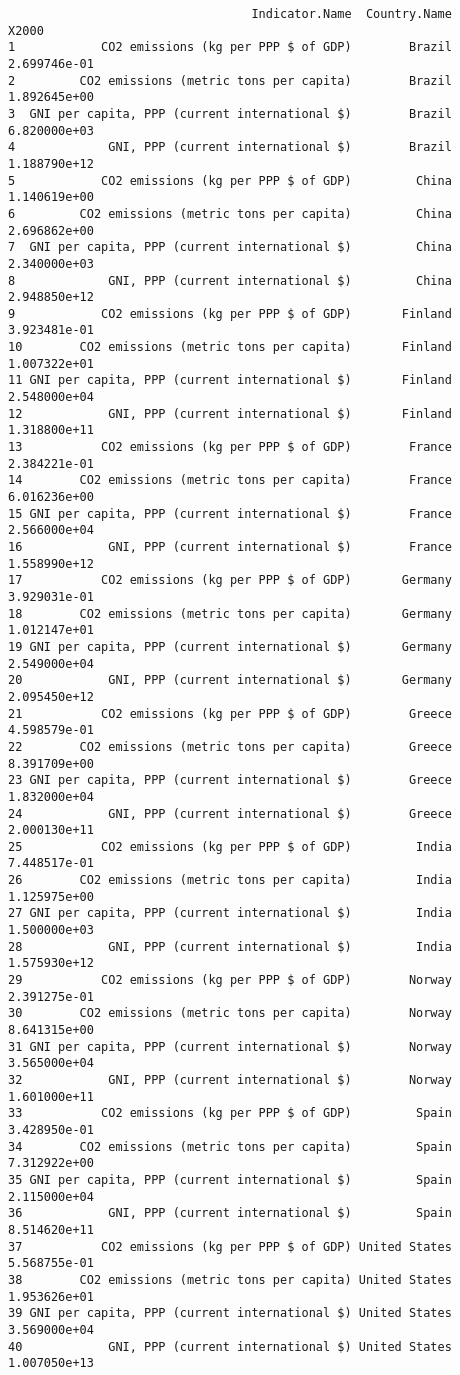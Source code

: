 \documentclass[xcolor={usenames,svgnames,dvipsnames}]{beamer}
\begin{document}
\begin{frame}[fragile]
\begin{verbatim}
                                  Indicator.Name  Country.Name        X2000
1            CO2 emissions (kg per PPP $ of GDP)        Brazil 2.699746e-01
2         CO2 emissions (metric tons per capita)        Brazil 1.892645e+00
3  GNI per capita, PPP (current international $)        Brazil 6.820000e+03
4             GNI, PPP (current international $)        Brazil 1.188790e+12
5            CO2 emissions (kg per PPP $ of GDP)         China 1.140619e+00
6         CO2 emissions (metric tons per capita)         China 2.696862e+00
7  GNI per capita, PPP (current international $)         China 2.340000e+03
8             GNI, PPP (current international $)         China 2.948850e+12
9            CO2 emissions (kg per PPP $ of GDP)       Finland 3.923481e-01
10        CO2 emissions (metric tons per capita)       Finland 1.007322e+01
11 GNI per capita, PPP (current international $)       Finland 2.548000e+04
12            GNI, PPP (current international $)       Finland 1.318800e+11
13           CO2 emissions (kg per PPP $ of GDP)        France 2.384221e-01
14        CO2 emissions (metric tons per capita)        France 6.016236e+00
15 GNI per capita, PPP (current international $)        France 2.566000e+04
16            GNI, PPP (current international $)        France 1.558990e+12
17           CO2 emissions (kg per PPP $ of GDP)       Germany 3.929031e-01
18        CO2 emissions (metric tons per capita)       Germany 1.012147e+01
19 GNI per capita, PPP (current international $)       Germany 2.549000e+04
20            GNI, PPP (current international $)       Germany 2.095450e+12
21           CO2 emissions (kg per PPP $ of GDP)        Greece 4.598579e-01
22        CO2 emissions (metric tons per capita)        Greece 8.391709e+00
23 GNI per capita, PPP (current international $)        Greece 1.832000e+04
24            GNI, PPP (current international $)        Greece 2.000130e+11
25           CO2 emissions (kg per PPP $ of GDP)         India 7.448517e-01
26        CO2 emissions (metric tons per capita)         India 1.125975e+00
27 GNI per capita, PPP (current international $)         India 1.500000e+03
28            GNI, PPP (current international $)         India 1.575930e+12
29           CO2 emissions (kg per PPP $ of GDP)        Norway 2.391275e-01
30        CO2 emissions (metric tons per capita)        Norway 8.641315e+00
31 GNI per capita, PPP (current international $)        Norway 3.565000e+04
32            GNI, PPP (current international $)        Norway 1.601000e+11
33           CO2 emissions (kg per PPP $ of GDP)         Spain 3.428950e-01
34        CO2 emissions (metric tons per capita)         Spain 7.312922e+00
35 GNI per capita, PPP (current international $)         Spain 2.115000e+04
36            GNI, PPP (current international $)         Spain 8.514620e+11
37           CO2 emissions (kg per PPP $ of GDP) United States 5.568755e-01
38        CO2 emissions (metric tons per capita) United States 1.953626e+01
39 GNI per capita, PPP (current international $) United States 3.569000e+04
40            GNI, PPP (current international $) United States 1.007050e+13
\end{verbatim}
\end{frame}
\end{document}
